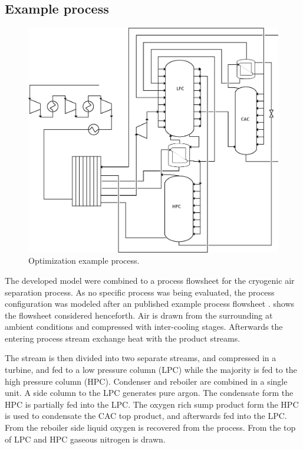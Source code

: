     \subsection{Example process}
    \begin{figure}
        \footnotesize
        \center
        \includegraphics[width=\linewidth]{Pictures/ASU_superstructure}
        \caption{Optimization example process.}
        \label{fig:opt:exppro}
    \end{figure}

    The developed model were combined to a process flowsheet for the cryogenic air separation process.
    As no specific process was being evaluated, the process configuration was modeled after an
    published example process flowsheet . 
    shows the flowsheet considered henceforth. Air is drawn from the surrounding at ambient conditions
    and compressed with inter-cooling stages. Afterwards the entering process stream exchange heat
    with the product streams.

    The stream is then divided into two separate streams, and compressed in a turbine, and fed to
    a low pressure column (LPC) while the majority is fed to the high pressure column (HPC).
    Condenser and reboiler are combined in a single unit. A side column to the LPC generates pure
    argon. The condensate form the HPC is partially fed into the LPC. The oxygen rich sump product form the HPC
    is used to condensate the CAC top product, and afterwards fed into the LPC. From the reboiler side liquid oxygen
    is recovered from the process. From the top of LPC and HPC gaseous nitrogen is drawn.


